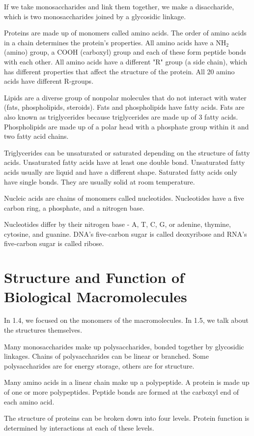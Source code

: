 \documentclass[../bio.tex]{subfiles}
\begin{document}
If we take monosaccharides and link them together, we make a disaccharide, which is two monosaccharides joined by a glycosidic linkage.

Proteins are made up of monomers called amino acids. The order of amino acids in a chain determines the protein's properties. All amino acids have a NH$_2$ (amino) group, a COOH (carboxyl) group and each of these form peptide bonds with each other. All amino acids have a different "R" group (a side chain), which has different properties that affect the structure of the protein. All 20 amino acids have different R-groups. 

Lipids are a diverse group of nonpolar molecules that do not interact with water (fats, phospholipids, steroids). Fats and phospholipids have fatty acids. Fats are also known as triglycerides because triglycerides are made up of 3 fatty acids. Phospholipids are made up of a polar head with a phosphate group within it and two fatty acid chains. 

Triglycerides can be unsaturated or saturated depending on the structure of fatty acids. Unsaturated fatty acids have at least one double bond. Unsaturated fatty acids usually are liquid and have a different shape. Saturated fatty acids only have single bonds. They are usually solid at room temperature.

Nucleic acids are chains of monomers called nucleotides. Nucleotides have a five carbon ring, a phosphate, and a nitrogen base. 

Nucleotides differ by their nitrogen base - A, T, C, G, or adenine, thymine, cytosine, and guanine. DNA's five-carbon sugar is called deoxyribose and RNA's five-carbon sugar is called ribose.
\section{Structure and Function of Biological Macromolecules}
In 1.4, we focused on the monomers of the macromolecules. In 1.5, we talk about the structures themselves. 

Many monosaccharides make up polysaccharides, bonded together by glycosidic linkages. Chains of polysaccharides can be linear or branched. Some polysaccharides are for energy storage, others are for structure.

Many amino acids in a linear chain make up a polypeptide. A protein is made up of one or more polypeptides. Peptide bonds are formed at the carboxyl end of each amino acid.

The structure of proteins can be broken down into four levels. Protein function is determined by interactions at each of these levels.
\end{document}
